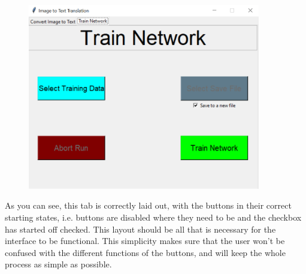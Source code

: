 \documentclass{report}
\begin{document}
\begin{figure}[H]
    \centering
    \includegraphics[width=4in]{Images/Development and Testing/Stage 8/Layout Test/Layout Test.png}
\end{figure}
\noindent As you can see, this tab is correctly laid out, with the buttons in their correct starting states, i.e. buttons are disabled where they need to be and the checkbox has started off checked. This layout should be all that is necessary for the interface to be functional. This simplicity makes sure that the user won't be confused with the different functions of the buttons, and will keep the whole process as simple as possible.
\end{document}
